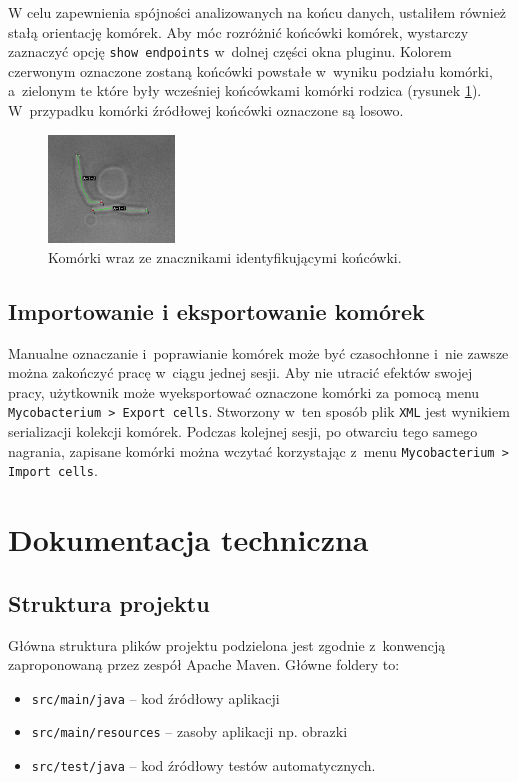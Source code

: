 \documentclass[declaration,shortabstract,mgr]{iithesis}
\begin{document}
W celu zapewnienia spójności analizowanych na końcu danych, ustaliłem również stałą orientację komórek.
Aby móc rozróżnić końcówki komórek, wystarczy zaznaczyć opcję \texttt{show endpoints} w~dolnej części okna pluginu.
Kolorem czerwonym oznaczone zostaną końcówki powstałe w~wyniku podziału komórki, a~zielonym te które były wcześniej końcówkami komórki rodzica (rysunek \ref{fig:ui-show-endpoints}). W~przypadku komórki źródłowej końcówki oznaczone są losowo.

\begin{figure}
  \centering
  \includegraphics[width=0.3\textwidth]{images/ui-show-endpoints.png}
  \caption{Komórki wraz ze znacznikami identyfikującymi końcówki.}
  \label{fig:ui-show-endpoints}
\end{figure}

\subsection{Importowanie i eksportowanie komórek}

Manualne oznaczanie i~poprawianie komórek może być czasochłonne i~nie zawsze można zakończyć pracę w~ciągu jednej sesji.
Aby nie utracić efektów swojej pracy, użytkownik może wyeksportować oznaczone komórki za pomocą menu \texttt{Mycobacterium > Export cells}.
Stworzony w~ten sposób plik \texttt{XML} jest wynikiem serializacji kolekcji komórek.
Podczas kolejnej sesji, po otwarciu tego samego nagrania, zapisane komórki można wczytać korzystając z~menu \texttt{Mycobacterium > Import cells}.

\section{Dokumentacja techniczna}

\subsection{Struktura projektu}

Główna struktura plików projektu podzielona jest zgodnie z~konwencją zaproponowaną przez zespół Apache Maven\cite{docs:maven-project-layout}. Główne foldery to:
\begin{itemize}
  \item \texttt{src/main/java} -- kod źródłowy aplikacji
  \item \texttt{src/main/resources} -- zasoby aplikacji np. obrazki
  \item \texttt{src/test/java} -- kod źródłowy testów automatycznych.
\end{itemize}
\end{document}
